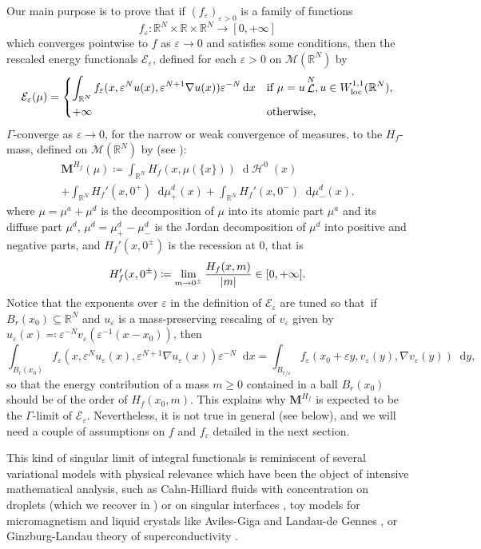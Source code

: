\documentclass[10pt]{amsart}
\theoremstyle{plain}
\theoremstyle{definition}
\newcommand{\dd}{\mathop{}\mathopen{}\mathrm{d}}
\newcommand{\R}{\mathbb{R}}
\newcommand{\Mspace}{\mathscr{M}}
\newcommand{\ener}{\mathcal{E}}
\newcommand{\mass}{\boldsymbol{M}}
\newcommand{\loc}{\mathrm{loc}}
\newcommand{\eps}{\varepsilon}
\DeclarePairedDelimiter{\abs}{\lvert}{\rvert}
\DeclareMathOperator{\hdm}{\mathcal{H}}
\DeclareMathOperator{\lbm}{\mathcal{L}}
\begin{document}
Our main purpose is to prove that if $(f_\eps)_{\eps > 0}$ is a family of functions
\[
f_\eps:\R^N\times\R\times\R^N\to[0,+\infty]
\]
which converges pointwise to \(f\) as \(\eps\to 0\) and satisfies some conditions, then the rescaled energy functionals \(\ener_\eps\), defined for each \(\eps>0\) on \(\Mspace(\R^N)\) by
\begin{equation}
\label{mainEnergyEpsilon}
\ener_\eps(\mu)=
\begin{dcases}
\int_{\R^N} f_\eps(x,\eps^N u(x), \eps^{N+1} \nabla u(x)) \eps^{-N} \dd x &\text{if }\mu = u\lbm^N, u\in W^{1,1}_\loc(\R^N),\\
+\infty&\text{otherwise,}
\end{dcases}
\end{equation}
\(\Gamma\)-converge as \(\eps\to 0\), for the narrow or weak convergence of measures, to the \(H_f\)-mass, defined on \(\Mspace(\R^N)\) by (see ):
\begin{multline*}
\mass^{H_f}(\mu) \coloneqq \int_{\R^N} H_f(x,\mu(\{x\}))\dd\hdm^0(x)\\
+\int_{\R^N} H_f'(x,0^+) \dd \mu^d_+(x) + \int_{\R^N} H_f'(x,0^-) \dd \mu^d_-(x).
\end{multline*}
where \(\mu = \mu^a+\mu^d\) is the decomposition of $\mu$ into its atomic part $\mu^a$ and its diffuse part $\mu^d$, $\mu^d = \mu^d_+ - \mu^d_-$ is the Jordan decomposition of $\mu^d$ into positive and negative parts, and $H_f'(x,0^\pm)$ is the recession at $0$, that is
\[H_f'(x,0^\pm) \coloneqq \lim_{m\to 0^\pm}\frac{H_f(x,m)}{\abs{m}}\in [0,+\infty].\]
Notice that the exponents over $\eps$ in the definition of $\ener_\eps$ are tuned so that~if~\hbox{\(B_r(x_0) \!\subseteq\!\R^N\)} and $u_\eps$ is a mass-preserving rescaling of $v_\eps$ given by $u_\eps(x) \eqqcolon \eps^{-N} v_\eps(\eps^{-1}(x-x_0))$, then
\[
\int_{B_r(x_0)} f_\eps(x,\eps^N u_\eps(x), \eps^{N+1} \nabla u_\eps(x)) \eps^{-N} \dd x = \int_{B_{r/\eps}} f_\eps(x_0+\eps y,v_\eps(y), \nabla v_\eps(y)) \dd y,
\]
so that the energy contribution of a mass \(m\geq 0\) contained in a ball \(B_r(x_0)\) should be of the order of \(H_f(x_0,m)\). This explains why \(\mass^{H_f}\) is expected to be the \(\Gamma\)-limit of \(\ener_\eps\). Nevertheless, it is not true in general (see  below), and we will need a couple of assumptions on \(f\) and \(f_\eps\) detailed in the next section.

This kind of singular limit of integral functionals is reminiscent of several variational models with physical relevance which have been the object of intensive mathematical analysis, such as Cahn-Hilliard fluids with concentration on droplets \cite{bouchitteTransitionsPhasesAvec1996} (which we recover in ) or on singular interfaces \cite{modicaEsempioDiGamma1977}, toy models for micromagnetism and liquid crystals like Aviles-Giga \cite{avilesLowerSemicontinuityDefect1999} and Landau-de Gennes \cite{baumanAnalysisNematicLiquid2012}, or Ginzburg-Landau theory of superconductivity \cite{bethuelGinzburgLandauVortices2017}.
\end{document}
